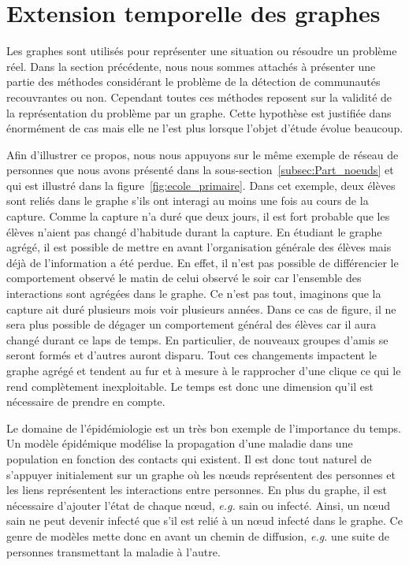 \section{Extension temporelle des graphes}
\label{sec:intro_extension_temporelle}

Les graphes sont utilisés pour représenter une situation ou résoudre un problème réel.
Dans la section précédente, nous nous sommes attachés à présenter une partie des méthodes considérant le problème de la détection de communautés recouvrantes ou non.
Cependant toutes ces méthodes reposent sur la validité de la représentation du problème par un graphe.
Cette hypothèse est justifiée dans énormément de cas mais elle ne l'est plus lorsque l'objet d'étude évolue beaucoup.

Afin d'illustrer ce propos, nous nous appuyons sur le même exemple de réseau de personnes que nous avons présenté dans la sous-section~\ref{subsec:Part_noeuds} et qui est illustré dans la figure~\ref{fig:ecole_primaire}.
Dans cet exemple, deux élèves sont reliés dans le graphe s'ils ont interagi au moins une fois au cours de la capture.
Comme la capture n'a duré que deux jours, il est fort probable que les élèves n'aient pas changé d'habitude durant la capture.
En étudiant le graphe agrégé, il est possible de mettre en avant l'organisation générale des élèves mais déjà de l'information a été perdue.
En effet, il n'est pas possible de différencier le comportement observé le matin de celui observé le soir car l'ensemble des interactions sont agrégées dans le graphe.
Ce n'est pas tout, imaginons que la capture ait duré plusieurs mois voir plusieurs années.
Dans ce cas de figure, il ne sera plus possible de dégager un comportement général des élèves car il aura changé durant ce laps de temps.
En particulier, de nouveaux groupes d'amis se seront formés et d'autres auront disparu.
Tout ces changements impactent le graphe agrégé et tendent au fur et à mesure à le rapprocher d'une clique ce qui le rend complètement inexploitable.
Le temps est donc une dimension qu'il est nécessaire de prendre en compte.

Le domaine de l'épidémiologie est un très bon exemple de l'importance du temps.
Un modèle épidémique modélise la propagation d'une maladie dans une population en fonction des contacts qui existent.
Il est donc tout naturel de s'appuyer initialement sur un graphe où les n\oe uds représentent des personnes et les liens représentent les interactions entre personnes.
En plus du graphe, il est nécessaire d'ajouter l'état de chaque n\oe ud, \emph{e.g.} sain ou infecté.
Ainsi, un n\oe ud sain ne peut devenir infecté que s'il est relié à un n\oe ud infecté dans le graphe.
Ce genre de modèles mette donc en avant un chemin de diffusion, \emph{e.g.} une suite de personnes transmettant la maladie à l'autre.

